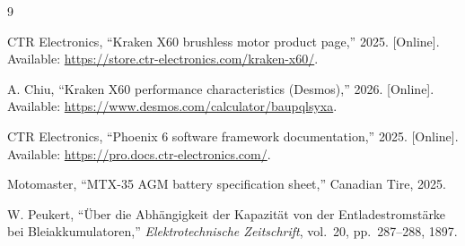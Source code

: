 \documentclass[12pt]{article}
\begin{document}
\newpage

\begin{thebibliography}{9}

CTR Electronics, ``Kraken X60 brushless motor product page,'' 2025.
[Online]. Available: \url{https://store.ctr-electronics.com/kraken-x60/}.

A. Chiu, ``Kraken X60 performance characteristics (Desmos),'' 2026.
[Online]. Available: \url{https://www.desmos.com/calculator/baupqlsyxa}.

CTR Electronics, ``Phoenix 6 software framework documentation,'' 2025.
[Online]. Available: \url{https://pro.docs.ctr-electronics.com/}.

Motomaster, ``MTX-35 AGM battery specification sheet,'' Canadian Tire, 2025.

W. Peukert, ``\"Uber die Abh\"angigkeit der Kapazit\"at von der
Entladestromst\"arke bei Bleiakkumulatoren,'' \emph{Elektrotechnische
Zeitschrift}, vol.~20, pp.~287--288, 1897.


\end{thebibliography}
\end{document}

